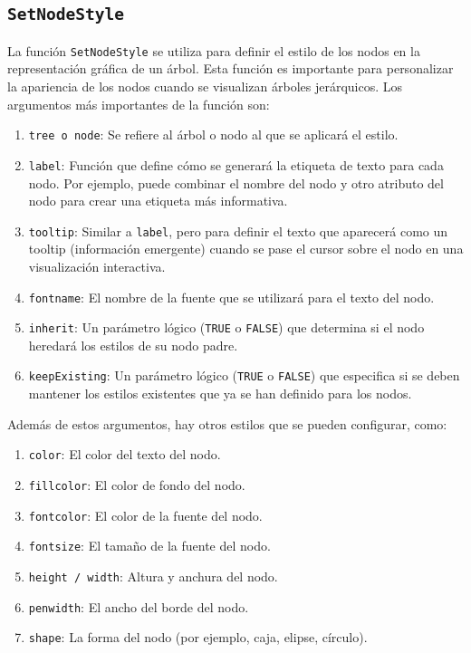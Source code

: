\documentclass[12pt]{report}\usepackage[]{graphicx}\usepackage[dvipsnames]{xcolor}
\begin{document}
		 	\subsection{\texttt{SetNodeStyle}}\label{subsec:node_style}
			 	
			 	La función \texttt{SetNodeStyle} se utiliza para definir el estilo de los nodos en la representación gráfica de un árbol. Esta función es importante para personalizar la apariencia de los nodos cuando se visualizan árboles jerárquicos. Los argumentos más importantes de la función son:
			 	
			 	\begin{enumerate}[label = \textbf{\arabic*.}]
			 		\item \texttt{tree o node}: Se refiere al árbol o nodo al que se aplicará el estilo.
			 		
			 		\item \texttt{label}: Función que define cómo se generará la etiqueta de texto para cada nodo. Por ejemplo, puede combinar el nombre del nodo y otro atributo del nodo para crear una etiqueta más informativa.
			 		
			 		\item \texttt{tooltip}: Similar a \texttt{label}, pero para definir el texto que aparecerá como un tooltip (información emergente) cuando se pase el cursor sobre el nodo en una visualización interactiva.
			 		
			 		\item \texttt{fontname}: El nombre de la fuente que se utilizará para el texto del nodo.
			 		
			 		\item \texttt{inherit}: Un parámetro lógico (\texttt{TRUE} o \texttt{FALSE}) que determina si el nodo heredará los estilos de su nodo padre.
			 		
			 		\item \texttt{keepExisting}: Un parámetro lógico (\texttt{TRUE} o \texttt{FALSE}) que especifica si se deben mantener los estilos existentes que ya se han definido para los nodos.
		 		\end{enumerate}
		 		\noindent Además de estos argumentos, hay otros estilos que se pueden configurar, como:
		 		\begin{enumerate}[label = \textbf{\arabic*.}]
			 		\item \texttt{color}: El color del texto del nodo.
			 		\item \texttt{fillcolor}: El color de fondo del nodo.
			 		\item \texttt{fontcolor}: El color de la fuente del nodo.
			 		\item \texttt{fontsize}: El tamaño de la fuente del nodo.
			 		\item \texttt{height / width}: Altura y anchura del nodo.
			 		\item \texttt{penwidth}: El ancho del borde del nodo.
			 		\item \texttt{shape}: La forma del nodo (por ejemplo, caja, elipse, círculo).
			 	\end{enumerate}
			 	
\end{document}
